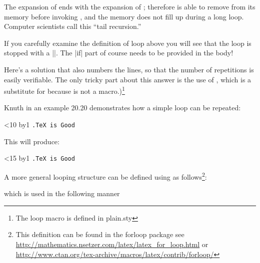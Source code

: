\begin{teX}
\begin{teX}
\begin{teX}
\begin{teX}
\def\loop#1\repeat{\def\body{#1}\iterate}
\def\iterate{\body\let\next=\iterate\else\let\next=\relax\fi\next}
\end{teX}



The expansion of  ends with the expansion of ; therefore \tex is able
to remove  from its memory before invoking , and the memory does not
fill up during a long loop. Computer scientists call this ``tail recursion.''

If you carefully examine the definition of loop above you will see that the loop is stopped with a |\relax\fi|. The |if| part of course needs to be provided in the body!


Here's a solution that also numbers the lines, so that the number of repetitions
is easily verifiable. The only tricky part about this answer is the use of , which
is a substitute for  because  is not a  macro.)\footnote{The loop macro is defined in plain.sty}

Knuth in an example 20.20 demonstrates how a simple loop can be repeated:

\begin{teX}
\newcount\n
\def\punishment#1#2{\n=0
    \loop\ifnum\n<#2 \advance\n by1
         {\tt {\number\n.}#1\endgraf}\repeat}
    \punishment{TeX is Good}{10}
\end{teX}

This will produce:

\newcount\n
\def\punishment#1#2{\n=0
\loop\ifnum\n<#2 \advance\n by1
{\tt {\number\n.}#1\endgraf}\repeat}

\punishment{TeX is Good}{15}



A more general looping structure can be defined using \latex as follows\footnote{This definition can be found in the forloop package see \url{http://mathematics.nsetzer.com/latex/latex_for_loop.html} or \url{http://www.ctan.org/tex-archive/macros/latex/contrib/forloop/}}:

\begin{teX}
\newcommand{\forloop}[5][1]%
{%
\setcounter{#2}{#3}%
\ifthenelse{#4}%
	{%
	#5%
	\addtocounter{#2}{#1}%
	\forloop[#1]{#2}{\value{#2}}{#4}{#5}%
	}%
	{%
	}%
}%
\end{teX}

which is used in the following manner


\begin{teX}
\end{teX}


\end{teX}
\end{teX}
\end{teX}
